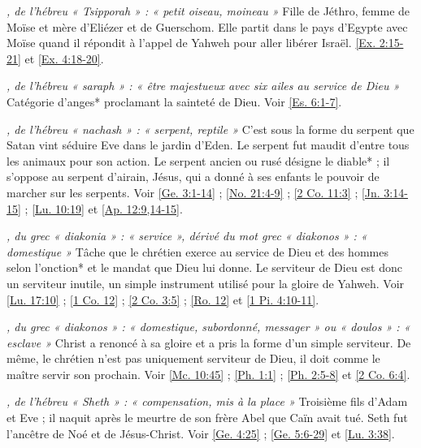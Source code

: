 \begin{multicols}{2}
\textit{, de l'hébreu « Tsipporah » : « petit oiseau, moineau »}\newline
Fille de Jéthro, femme de Moïse et mère d'Eliézer et de Guerschom. Elle partit dans le pays d'Egypte avec Moïse quand il répondit à l'appel de Yahweh pour aller libérer Israël. \vref{Ex. 2:15-21} et \vref{Ex. 4:18-20}.

\textit{, de l'hébreu « saraph » : « être majestueux avec six ailes au service de Dieu »}\newline
Catégorie d'anges* proclamant la sainteté de Dieu. Voir \vref{Es. 6:1-7}.

\textit{, de l'hébreu « nachash » : « serpent, reptile »}\newline
C'est sous la forme du serpent que Satan vint séduire Eve dans le jardin d'Eden. Le serpent fut maudit d'entre tous les animaux pour son action. Le serpent ancien ou rusé désigne le diable* ; il s'oppose au serpent d'airain, Jésus, qui a donné à ses enfants le pouvoir de marcher sur les serpents. Voir \vref{Ge. 3:1-14} ; \vref{No. 21:4-9} ; \vref{2 Co. 11:3} ; \vref{Jn. 3:14-15} ; \vref{Lu. 10:19} et \vref{Ap. 12:9,14-15}.

\textit{, du grec « diakonia » : « service », dérivé du mot grec « diakonos » : « domestique »}\newline
Tâche que le chrétien exerce au service de Dieu et des hommes selon l'onction* et le mandat que Dieu lui donne. Le serviteur de Dieu est donc un serviteur inutile, un simple instrument utilisé pour la gloire de Yahweh. Voir \vref{Lu. 17:10} ; \vref{1 Co. 12} ; \vref{2 Co. 3:5} ; \vref{Ro. 12} et \vref{1 Pi. 4:10-11}.

\textit{, du grec « diakonos » : « domestique, subordonné, messager » ou « doulos » : « esclave »}\newline
Christ a renoncé à sa gloire et a pris la forme d'un simple serviteur. De même, le chrétien n'est pas uniquement serviteur de Dieu, il doit comme le maître servir son prochain. Voir \vref{Mc. 10:45} ; \vref{Ph. 1:1} ; \vref{Ph. 2:5-8} et \vref{2 Co. 6:4}.

\textit{, de l'hébreu « Sheth » : « compensation, mis à la place »}\newline
Troisième fils d'Adam et Eve ; il naquit après le meurtre de son frère Abel que Caïn avait tué. Seth fut l'ancêtre de Noé et de Jésus-Christ. Voir \vref{Ge. 4:25} ; \vref{Ge. 5:6-29} et \vref{Lu. 3:38}.


\end{multicols}
